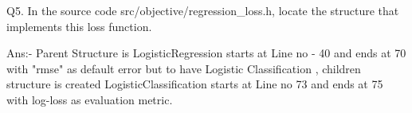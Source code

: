 \documentclass{article}
\begin{document}
\begin{flushleft}
Q5. In the source code src/objective/regression\_loss.h, locate the structure that implements this loss function.

Ans:- Parent Structure is LogisticRegression starts at Line no - 40 and ends at 70 with "rmse" as default error but to have Logistic Classification , children structure is created LogisticClassification starts at Line no 73 and ends at 75 with log-loss as evaluation metric.




\end{flushleft}
\end{document}
